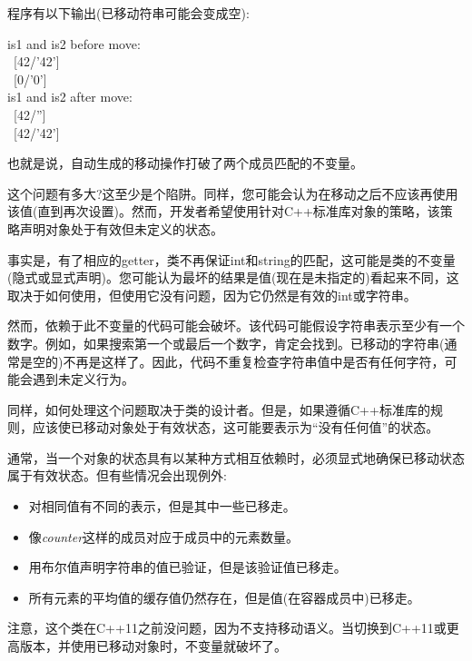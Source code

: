 程序有以下输出(已移动符串可能会变成空):\par

\begin{tcolorbox}[colback=white,colframe=black]
is1 and is2 before move: \\
\ [42/'42'] \\
\ [0/'0'] \\
is1 and is2 after move: \\
\ [42/''] \\
\ [42/'42']
\end{tcolorbox}

也就是说，自动生成的移动操作打破了两个成员匹配的不变量。\par

这个问题有多大?这至少是个陷阱。同样，您可能会认为在移动之后不应该再使用该值(直到再次设置)。然而，开发者希望使用针对C++标准库对象的策略，该策略声明对象处于有效但未定义的状态。\par

事实是，有了相应的getter，类不再保证int和string的匹配，这可能是类的不变量(隐式或显式声明)。您可能认为最坏的结果是值(现在是未指定的)看起来不同，这取决于如何使用，但使用它没有问题，因为它仍然是有效的int或字符串。\par

然而，依赖于此不变量的代码可能会破坏。该代码可能假设字符串表示至少有一个数字。例如，如果搜索第一个或最后一个数字，肯定会找到。已移动的字符串(通常是空的)不再是这样了。因此，代码不重复检查字符串值中是否有任何字符，可能会遇到未定义行为。\par

同样，如何处理这个问题取决于类的设计者。但是，如果遵循C++标准库的规则，应该使已移动对象处于有效状态，这可能要表示为“没有任何值”的状态。\par

通常，当一个对象的状态具有以某种方式相互依赖时，必须显式地确保已移动状态属于有效状态。但有些情况会出现例外:\par

\begin{itemize}
	\item 对相同值有不同的表示，但是其中一些已移走。
	\item 像\textit{counter}这样的成员对应于成员中的元素数量。
	\item 用布尔值声明字符串的值已验证，但是该验证值已移走。
	\item 所有元素的平均值的缓存值仍然存在，但是值(在容器成员中)已移走。
\end{itemize}

注意，这个类在C++11之前没问题，因为不支持移动语义。当切换到C++11或更高版本，并使用已移动对象时，不变量就破坏了。\par

